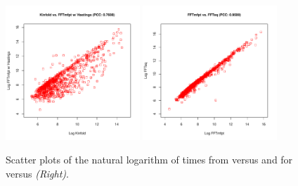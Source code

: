 \begin{figure}[!ht]
\centering
\includegraphics[width=0.45\textwidth]{Figures/Hermes/kinfoldFftMfptHastings.pdf}
\quad
\includegraphics[width=0.45\textwidth]{Figures/Hermes/fftMfptFftEq.pdf}
\caption{ Scatter plots of the natural logarithm of times from \kinfold
versus  and for \fftmfpt versus \ffteq
{\em (Right)}. }
\label{fig:hermes:scatterplotFftMfptVsKinfoldAndFftEq}
\end{figure}

